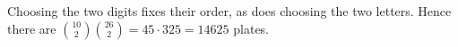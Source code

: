 Choosing the two digits fixes their order, as does choosing the two letters. Hence there are $\binom{10}{2}\binom{26}{2}=45\cdot325=\boxed{14625}$ plates.
